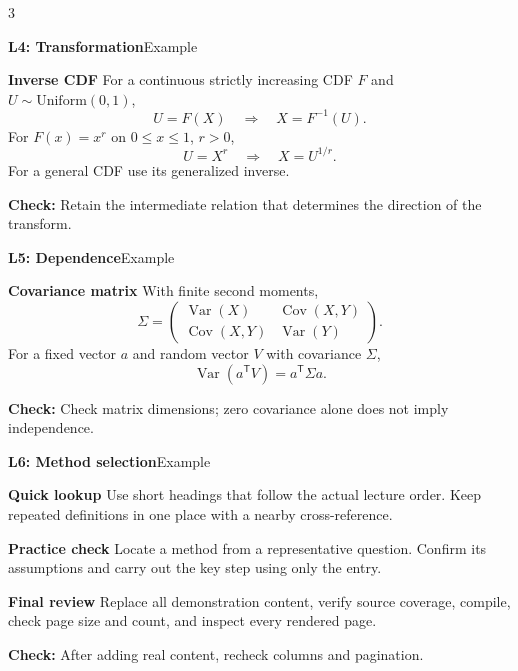 \documentclass[a4paper]{article}
\newcommand{\topic}[2]{%
  \par\vspace{3pt}\noindent
  \colorbox{black!10}{\parbox{\dimexpr\linewidth-2\fboxsep\relax}{%
    \textbf{#1}\hfill{\fontsize{7}{8}\selectfont #2}}}\par}
\newcommand{\method}[1]{\par\textbf{#1}\enspace}
\newcommand{\caution}[1]{\par\textbf{Check: }#1\par}
\newcommand{\Var}{\operatorname{Var}}
\newcommand{\Cov}{\operatorname{Cov}}
\begin{document}
\begin{multicols*}{3}
\topic{L4: Transformation}{Example}
\method{Inverse CDF}
For a continuous strictly increasing CDF $F$ and $U\sim\mathrm{Uniform}(0,1)$,
\[
 U=F(X)\quad\Longrightarrow\quad X=F^{-1}(U).
\]
For $F(x)=x^r$ on $0\le x\le1$, $r>0$,
\[
 U=X^r\quad\Longrightarrow\quad X=U^{1/r}.
\]
For a general CDF use its generalized inverse.
\caution{Retain the intermediate relation that determines the direction of the transform.}
\columnbreak
\topic{L5: Dependence}{Example}
\method{Covariance matrix}
With finite second moments,
\[
 \Sigma=\begin{pmatrix}
 \Var(X)&\Cov(X,Y)\\
 \Cov(X,Y)&\Var(Y)
 \end{pmatrix}.
\]
For a fixed vector $a$ and random vector $V$ with covariance $\Sigma$,
\[
 \Var(a^{\mathsf T}V)=a^{\mathsf T}\Sigma a.
\]
\caution{Check matrix dimensions; zero covariance alone does not imply independence.}
\columnbreak
\topic{L6: Method selection}{Example}
\method{Quick lookup}
Use short headings that follow the actual lecture order. Keep repeated definitions in one place with a nearby cross-reference.
\method{Practice check}
Locate a method from a representative question. Confirm its assumptions and carry out the key step using only the entry.
\method{Final review}
Replace all demonstration content, verify source coverage, compile, check page size and count, and inspect every rendered page.
\caution{After adding real content, recheck columns and pagination.}
\end{multicols*}
\end{document}
